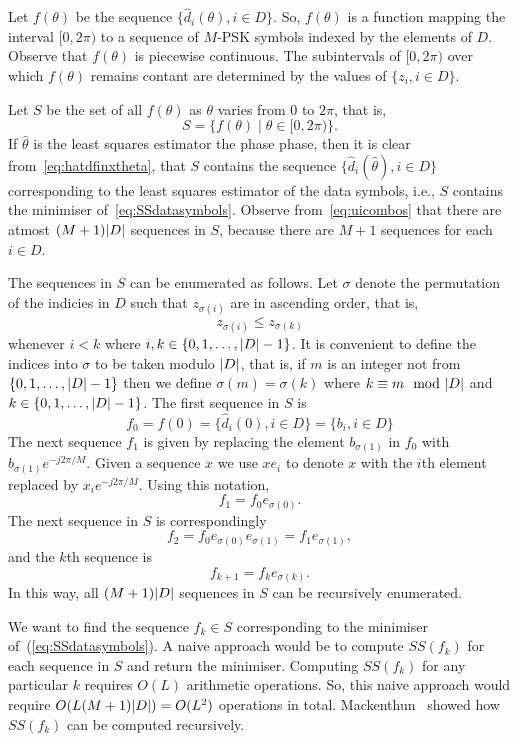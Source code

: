 \documentclass[journal]{IEEEtran}
\begin{document}
Let $f(\theta)$ be the sequence $\{ \hat{d}_i(\theta), i \in D \}$. So, $f(\theta)$ is a function mapping the interval $[0, 2\pi)$ to a sequence of $M$-PSK symbols indexed by the elements of $D$.  Observe that $f(\theta)$ is piecewise continuous.  The subintervals of $[0, 2\pi)$ over which $f(\theta)$ remains contant are determined by the values of $\{z_i, i \in D\}$.

Let $S$ be the set of all $f(\theta)$ as $\theta$ varies from $0$ to $2\pi$, that is,
\[
S = \{ f(\theta) \mid \theta \in [0, 2 \pi) \}.
\]
If $\hat{\theta}$ is the least squares estimator the phase phase, then it is clear from~\eqref{eq:hatdfinxtheta}, that $S$ contains the sequence $\{ \hat{d}_i(\hat{\theta}), i \in D \}$ corresponding to the least squares estimator of the data symbols, i.e., $S$ contains the minimiser of~\eqref{eq:SSdatasymbols}.  Observe from~\eqref{eq:uicombos} that there are atmost $(M+1){\left| D \right|}$ sequences in $S$, because there are $M+1$ sequences for each $i \in D$.

The sequences in $S$ can be enumerated as follows.  Let $\sigma$ denote the permutation of the indicies in $D$ such that $z_{\sigma(i)}$ are in ascending order, that is,
\begin{equation}\label{eq:sigmasortind}
z_{\sigma(i)} \leq z_{\sigma(k)}
\end{equation}
whenever $i < k $ where $i, k \in \{0, 1, \dots, {\left| D \right|}-1\}$.  It is convenient to define the indices into $\sigma$ to be taken modulo ${\left| D \right|}$, that is, if $m$ is an integer not from $\{0, 1, \dots, {\left| D \right|}-1\}$ then we define $\sigma(m) = \sigma(k)$ where $k \equiv m \mod \abs{D}$ and $k \in  \{0, 1, \dots, {\left| D \right|}-1\}$.  The first sequence in $S$ is 
\[
f_0 = f(0) = \{ \hat{d}_i(0), i \in D \} = \{ b_i, i \in D \}
\]  
The next sequence $f_1$ is given by replacing the element $b_{\sigma(1)}$ in $f_0$ with $b_{\sigma(1)}e^{-j2\pi/M}$.  Given a sequence $x$ we use $x e_i$ to denote $x$ with the $i$th element replaced by $x_i e^{-j2\pi/M}$.  Using this notation,  
\[
f_1 = f_0 e_{\sigma(0)}.
\] 
The next sequence in $S$ is correspondingly 
\[
f_2 = f_0 e_{\sigma(0)} e_{\sigma(1)} = f_1 e_{\sigma(1)},
\]
and the $k$th sequence is
\begin{equation}\label{eq:fkrec}
f_{k+1} = f_{k} e_{\sigma(k)}.
\end{equation}
In this way, all $(M+1){\left| D \right|}$ sequences in $S$ can be recursively enumerated.

We want to find the sequence $f_k \in S$ corresponding to the minimiser of~(\ref{eq:SSdatasymbols}).  A naive approach would be to compute $SS(f_k)$ for each sequence in $S$ and return the minimiser.  Computing $SS(f_k)$ for any particular $k$ requires $O(L)$ arithmetic operations.  So, this naive approach would require $O(L (M+1) {\left| D \right|}) = O(L^2)$ operations in total.  Mackenthun~\cite{Mackenthun1994} showed how $SS(f_k)$ can be computed recursively.
\end{document}
